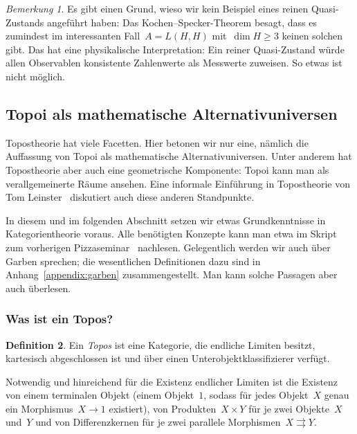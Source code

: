 \documentclass[a4paper,ngerman,12pt]{scrartcl}
\theoremstyle{definition}
\newtheorem{defn}{Definition}[section]
\theoremstyle{plain}
\theoremstyle{remark}
\newtheorem{bem}[defn]{Bemerkung}
\renewcommand{\_}{\mathpunct{.}\,}
\newcommand{\?}{\,{:}\,}
\begin{document}
\begin{bem}\label{bem:keine-reinen-quasi-zustaende}%
Es gibt einen Grund, wieso wir kein Beispiel eines reinen Quasi-Zustands
angeführt haben: Das Kochen--Specker-Theorem besagt, dass es zumindest im
interessanten Fall~$A = L(H,H)$ mit~$\dim H \geq 3$ keinen solchen gibt. Das
hat eine physikalische Interpretation: Ein reiner Quasi-Zustand würde allen
Observablen konsistente Zahlenwerte als Messwerte zuweisen. So etwas ist nicht
möglich.\end{bem}


\subsection{Topoi als mathematische Alternativuniversen}

\label{sect:topoi}%
Topostheorie hat viele Facetten. Hier betonen wir nur eine, nämlich
die Auffassung von Topoi als mathematische Alternativuniversen. Unter anderem
hat Topostheorie aber auch eine geometrische Komponente: Topoi kann man als
verallgemeinerte Räume ansehen. Eine informale Einführung in Topostheorie
von Tom Leinster~\cite{leinster:topos} diskutiert auch diese anderen
Standpunkte.

In diesem und im folgenden Abschnitt setzen wir etwas Grundkenntnisse in
Kategorientheorie voraus. Alle benötigten Konzepte kann man etwa im
Skript zum vorherigen Pizzaseminar~\cite{pizzaseminar:kategorientheorie}
nachlesen. Gelegentlich werden wir auch über Garben sprechen; die wesentlichen
Definitionen dazu sind in Anhang~\ref{appendix:garben} zusammengestellt. Man
kann solche Passagen aber auch überlesen.


\subsubsection*{Was ist ein Topos?}

\begin{defn}Ein \emph{Topos} ist eine Kategorie, die endliche Limiten besitzt,
kartesisch abgeschlossen ist und über einen Unterobjektklassifizierer verfügt.
\end{defn}

Notwendig und hinreichend für die Existenz endlicher Limiten ist die Existenz
von einem terminalen Objekt (einem Objekt~$1$, sodass für jedes Objekt~$X$ genau
ein Morphismus~$X \to 1$ existiert), von Produkten~$X \times Y$ für je zwei
Objekte~$X$ und~$Y$ und von Differenzkernen für je zwei parallele Morphismen~$X
\rightrightarrows Y$.
\end{document}
